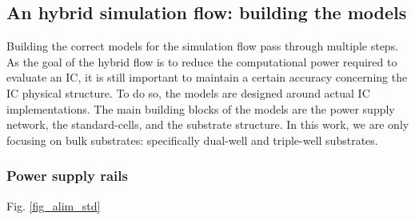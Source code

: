 \subsection{An hybrid simulation flow: building the models}
	Building the correct models for the simulation flow pass through multiple steps.
	As the goal of the hybrid flow is to reduce the computational power required to evaluate an IC, it is still important to maintain a certain accuracy concerning the IC physical structure.
	To do so, the models are designed around actual IC implementations.
	The main building blocks of the models are the power supply network, the standard-cells, and the substrate structure.
	In this work, we are only focusing on bulk substrates: specifically dual-well and triple-well substrates.

	\subsubsection{Power supply rails}
	
	Fig. \ref{fig_alim_std}
